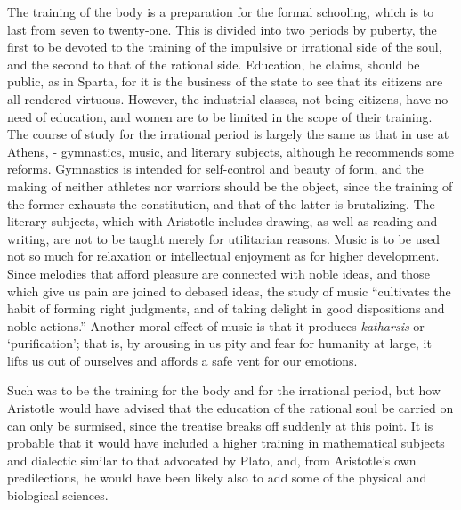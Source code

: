 \documentclass[]{book}
\begin{document}
The training of the body is a preparation for the formal schooling, which is to last from seven to twenty-one. This is divided into two periods by puberty, the first to be devoted to the training of the impulsive or irrational side of the soul, and the second to that of the rational side. Education, he claims, should be public, as in Sparta, for it is the business of the state to see that its citizens are all rendered virtuous. However, the industrial classes, not being citizens, have no need of education, and women are to be limited in the scope of their training. The course of study for the irrational period is largely the same as that in use at Athens, - gymnastics, music, and literary subjects, although he recommends some reforms. Gymnastics is intended for self-control and beauty of form, and the making of neither athletes nor warriors should be the object, since the training of the former exhausts the constitution, and that of the latter is brutalizing. The literary subjects, which with Aristotle includes drawing, as well as reading and writing, are not to be taught merely for utilitarian reasons. Music is to be used not so much for relaxation or intellectual enjoyment as for higher development. Since melodies that afford pleasure are connected with noble ideas, and those which give us pain are joined to debased ideas, the study of music ``cultivates the habit of forming right judgments, and of taking delight in good dispositions and noble actions.'' Another moral effect of music is that it produces \emph{katharsis} or `purification'; that is, by arousing in us pity and fear for humanity at large, it lifts us out of ourselves and affords a safe vent for our emotions.

Such was to be the training for the body and for the irrational period, but how Aristotle would have advised that the education of the rational soul be carried on can only be surmised, since the treatise breaks off suddenly at this point. It is probable that it would have included a higher training in mathematical subjects and dialectic similar to that advocated by Plato, and, from Aristotle's own predilections, he would have been likely also to add some of the physical and biological sciences.
\end{document}
